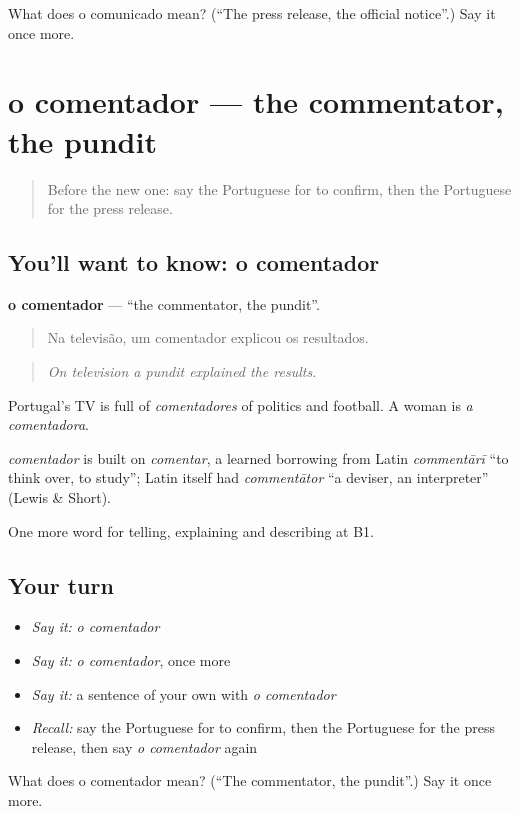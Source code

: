 \begin{tcolorbox}[breakable,colback=teal!4,colframe=teal!35!black,title={Before you move on}]
What does o comunicado mean? (\textquotedblleft{}The press release, the official notice\textquotedblright{}.) Say it once more.
\end{tcolorbox}
\section[o comentador]{o comentador — the commentator, the pundit}

\label{lesson:PT-C282-comentador}



\begin{quote}
Before the new one: say the Portuguese for to confirm, then the Portuguese for the press release.
\end{quote}

\subsection*{You'll want to know: o comentador}
\textbf{o comentador} — \textquotedblleft{}the commentator, the pundit\textquotedblright{}.

\begin{quote}
Na televisão, um comentador explicou os resultados.
\end{quote}

\begin{quote}
\emph{On television a pundit explained the results.}
\end{quote}

Portugal’s TV is full of \emph{comentadores} of politics and football. A woman is \emph{a comentadora}.

\begin{cousinweb}
\emph{comentador} is built on \emph{comentar}, a learned borrowing from Latin \emph{commentārī} \textquotedblleft{}to think over, to study\textquotedblright{}; Latin itself had \emph{commentātor} \textquotedblleft{}a deviser, an interpreter\textquotedblright{} (Lewis \& Short).
\end{cousinweb}

\begin{grammarlens}[title={What you've built}]
One more word for telling, explaining and describing at B1.
\end{grammarlens}

\subsection*{Your turn}
\begin{itemize}
\raggedright
  \item \emph{Say it:} \emph{o comentador}
  \item \emph{Say it:} \emph{o comentador}, once more
  \item \emph{Say it:} a sentence of your own with \emph{o comentador}
  \item \emph{Recall:} say the Portuguese for to confirm, then the Portuguese for the press release, then say \emph{o comentador} again
\end{itemize}

\begin{tcolorbox}[breakable,colback=teal!4,colframe=teal!35!black,title={Before you move on}]
What does o comentador mean? (\textquotedblleft{}The commentator, the pundit\textquotedblright{}.) Say it once more.
\end{tcolorbox}
